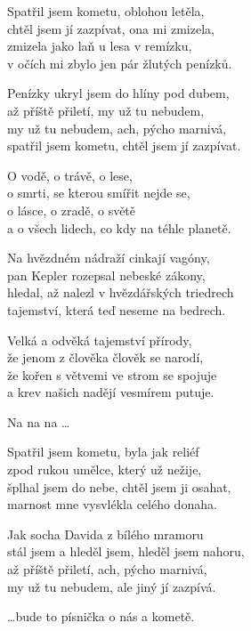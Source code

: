 
\ve{}
Spatřil jsem kometu, oblohou letěla,\\
chtěl jsem jí zazpívat, ona mi zmizela,\\
zmizela jako laň u lesa v remízku,\\
v očích mi zbylo jen pár žlutých penízků.

Penízky ukryl jsem do hlíny pod dubem,\\
až příště přiletí, my už tu nebudem,\\
my už tu nebudem, ach, pýcho marnivá,\\
spatřil jsem kometu, chtěl jsem jí zazpívat.

\cho{}
O vodě, o trávě, o lese,\\
o smrti, se kterou smířit nejde se,\\
o lásce, o zradě, o světě\\
a o všech lidech, co kdy  na téhle planetě.

\ve{}
Na hvězdném nádraží cinkají vagóny,\\
pan Kepler rozepsal nebeské zákony,\\
hledal, až nalezl v hvězdářských triedrech\\
tajemství, která teď neseme na bedrech.

Velká a odvěká tajemství přírody,\\
že jenom z člověka člověk se narodí,\\
že kořen s větvemi ve strom se spojuje\\
a krev našich nadějí vesmírem putuje.

\cho{}
Na na na \ldots

\ve{}
Spatřil jsem kometu, byla jak reliéf\\
zpod rukou umělce, který už nežije,\\
šplhal jsem do nebe, chtěl jsem ji osahat,\\
marnost mne vysvlékla celého donaha.

Jak socha Davida z bílého mramoru\\
stál jsem a hleděl jsem, hleděl jsem nahoru,\\
až příště přiletí, ach, pýcho marnivá,\\
my už tu nebudem, ale jiný jí zazpívá.

\cho{}
\ldots{}bude to písnička o nás a kometě. 

\esong
